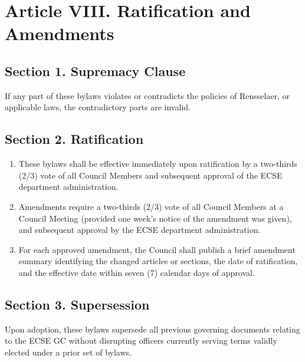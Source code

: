 \documentclass[11pt]{article}
\newcommand{\depname}{ECSE}
\newcommand{\orgshort}{ECSE GC}
\newcommand{\Article}[2]{\section*{Article #1. #2}}
\newcommand{\Sec}[1]{\subsection*{Section {#1}}}
\begin{document}
\Article{VIII}{Ratification and Amendments}

\Sec{1. Supremacy Clause}
If any part of these bylaws violates or contradicts the policies of Rensselaer, or applicable laws, the contradictory parts are invalid.

\Sec{2. Ratification}
\begin{enumerate}[label=\alph*)]
    \item These bylaws shall be effective immediately upon ratification by a two-thirds (2/3) vote of all Council Members and subsequent approval of the \depname{} department administration.
    \item Amendments require a two-thirds (2/3) vote of all Council Members at a Council Meeting (provided one week's notice of the amendment was given), and subsequent approval by the \depname{} department administration.
    \item For each approved amendment, the Council shall publish a brief amendment summary identifying the changed articles or sections, the date of ratification, and the effective date within seven (7) calendar days of approval.
\end{enumerate}

\Sec{3. Supersession}
Upon adoption, these bylaws supersede all previous governing documents relating to the \orgshort{} without disrupting officers currently serving terms validly elected under a prior set of bylaws.
\end{document}
